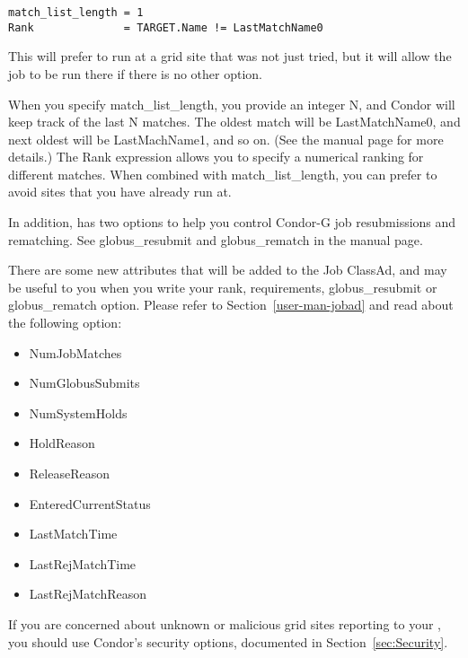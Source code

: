 \begin{verbatim}
match_list_length = 1
Rank              = TARGET.Name != LastMatchName0
\end{verbatim}

This will prefer to run at a grid site that was not just tried, but it
will allow the job to be run there if there is no other option. 

When you specify match\_list\_length, you provide an integer N, and
Condor will keep track of the last N matches. The oldest match will be
LastMatchName0, and next oldest will be LastMachName1, and so on. (See
the  manual page for more details.) The Rank expression
allows you to specify a numerical ranking for different matches. When
combined with match\_list\_length, you can prefer to avoid sites that
you have already run at. 

In addition,  has two options to help you control
Condor-G job resubmissions and rematching. See globus\_resubmit and
globus\_rematch in the  manual page. 

There are some new attributes that will be added to the Job ClassAd,
and may be useful to you when you write your rank, requirements,
globus\_resubmit or globus\_rematch option. Please refer to
Section~\ref{user-man-jobad} and read about the following option:

\begin{itemize}
\item NumJobMatches
\item NumGlobusSubmits
\item NumSystemHolds
\item HoldReason
\item ReleaseReason
\item EnteredCurrentStatus
\item LastMatchTime
\item LastRejMatchTime
\item LastRejMatchReason
\end{itemize}

If you are concerned about unknown or malicious grid sites reporting
to your , you should use Condor's security options,
documented in Section~\ref{sec:Security}.

